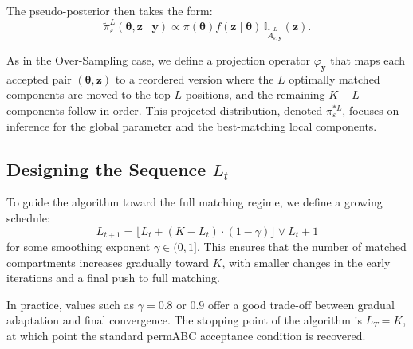 \documentclass[lineno]{biometrika}
\def\obsdata{\mathbf{y}}
\def\param{\boldsymbol{\theta}}
\def\proj{\varphi_{\obsdata}}
\def\simdata{\mathbf{z}}
\begin{document}
The pseudo-posterior then takes the form:
\[
\tilde{\pi}_\varepsilon^L(\param, \simdata \mid \obsdata) \propto \pi(\param) f(\simdata \mid \param) \, \mathbb{I}_{\tilde A_{\varepsilon, \obsdata}^{L}}(\simdata).
\]

As in the Over-Sampling case, we define a projection operator \( \proj \) that maps each accepted pair \( (\param, \simdata) \) to a reordered version where the \( L \) optimally matched components are moved to the top \( L \) positions, and the remaining \( K - L \) components follow in order. This projected distribution, denoted \( \pi^{*L}_\varepsilon \), focuses on inference for the global parameter and the best-matching local components.

\subsection{Designing the Sequence \( L_t \)}

To guide the algorithm toward the full matching regime, we define a growing schedule:
\[
L_{t+1} = \lfloor L_t + (K - L_t) \cdot (1-\gamma) \rfloor \vee L_t + 1
\]
for some smoothing exponent \( \gamma \in (0, 1] \). This ensures that the number of matched compartments increases gradually toward \( K \), with smaller changes in the early iterations and a final push to full matching.

In practice, values such as \( \gamma = 0.8 \) or \( 0.9 \) offer a good trade-off between gradual adaptation and final convergence. The stopping point of the algorithm is \( L_T = K \), at which point the standard permABC acceptance condition is recovered.




\end{document}
